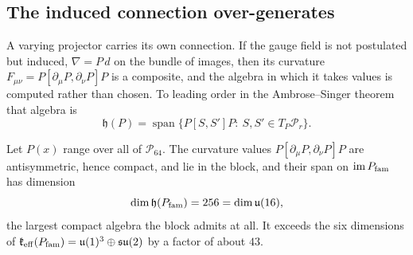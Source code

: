 \subsection{The induced connection over-generates}

A varying projector carries its own connection. If the gauge field is not postulated but induced, $\nabla=P\,d$ on the bundle of
images, then its curvature $F_{\mu\nu}=P[\partial_\mu P,\partial_\nu P]P$ is a composite, and the algebra in which it takes values is
computed rather than chosen. To leading order in the Ambrose--Singer theorem that algebra is
\[
\mathfrak h(P)=\operatorname{span}\bigl\{P[S,S']P:\ S,S'\in T_P\mathcal P_r\bigr\}.
\]

\begin{theorem}
\label{thm:holonomy}
Let $P(x)$ range over all of $\mathcal P_{64}$. The curvature values $P[\partial_\mu P,\partial_\nu P]P$ are antisymmetric, hence
compact, and lie in the block, and their span on $\operatorname{im}P_{\rm fam}$ has dimension
\[
\dim\mathfrak h(P_{\rm fam})=256=\dim\mathfrak{u}(16),
\]
the largest compact algebra the block admits at all. It exceeds the six dimensions of $\mathfrak k_{\rm eff}(P_{\rm fam})=\mathfrak{u}(1)^3\oplus\mathfrak{su}(2)$ by a factor
of about $43$.
\end{theorem}

